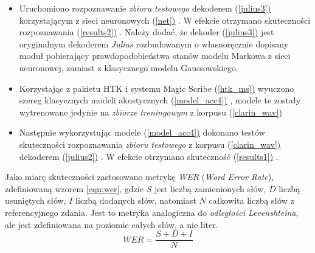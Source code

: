 \documentclass[shortabstract, mgr]{iithesis}
\newcommand{\refBlock}[1]{(\hyperref[#1]{\ref*{#1})}
}
\begin{document}
\begin{itemize}
		\item Uruchomiono rozpoznawanie \textit{zbioru testowego} dekoderem \refBlock{julius3} korzystającym z sieci neuronowych \refBlock{net}. W efekcie otrzymano skuteczności rozpoznawania \refBlock{results2}. Należy dodać, że dekoder \refBlock{julius3} jest oryginalnym dekoderem \textit{Julius} rozbudowanym o własnoręcznie dopisany moduł pobierający prawdopodobieństwa stanów modelu Markowa z sieci neuronowej, zamiast z klasycznego modelu Gaussowskiego.
		
		\item Korzystając z pakietu HTK i systemu Magic Scribe \refBlock{htk_ms} wyuczono szereg klasycznych modeli akustycznych \refBlock{model_acc4}, modele te zostały wytrenowane jedynie na \textit{zbiorze treningowym} z korpusu \refBlock{clarin_wav}
		
		\item Następnie wykorzystując modele \refBlock{model_acc4} dokonano testów skuteczności rozpoznawania \textit{zbioru testowego} z korpusu \refBlock{clarin_wav} dekoderem \refBlock{julius2}. W efekcie otrzymano skuteczność \refBlock{results1}.
	\end{itemize}

	Jako miarę skuteczności zastosowano metrykę \textit{WER} (\textit{Word Error Rate}), zdefiniowaną wzorem \ref{eqn:wer}, gdzie $S$ jest liczbą zamienionych słów, $D$ liczbą usuniętych słów, $I$ liczbą dodanych słów, natomiast $N$ całkowita liczbą słów z referencyjnego zdania. Jest to metryka analogiczna do \textit{odległości Levenshteina}, ale jest zdefiniowana na poziomie całych słów, a nie liter.
	\begin{equation}
		WER = \frac{S+D+I}{N}
		\label{eqn:wer}
	\end{equation}
	
\end{document}
